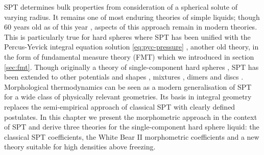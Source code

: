 \documentclass[11pt,twoside]{report}
\begin{document}
SPT determines bulk properties from consideration of a spherical solute of varying radius.
It remains one of most enduring theories of simple liquids; though 60 years old as of this year \cite{ReissJCP1959}, aspects of this approach remain in modern theories.
This is particularly true for hard spheres where SPT has been unified with the Percus-Yevick integral equation solution \eqref{eq:pyc-pressure} \cite{WertheimPRL1963}, another old theory, in the form of fundamental measure theory (FMT) \cite{RosenfeldPRL1989} which we introduced in section \ref{sec:fmt}.
Though originally a theory of single-component hard spheres \cite{ReissJCP1959}, SPT has been extended to other potentials \cite{ReissJCP1960,HelfandJCP1960,ReissJCP1961} and shapes \cite{GibbonsMP1969,GibbonsMP1970}, mixtures \cite{LebowitzJCP1965}, dimers \cite{StillingerJCP2006,ChatterjeeJCP2006} and discs \cite{HelfandJCP1961,MartinJCP2018,Hansen-GoosJCP2019}.
Morphological thermodynamics can be seen as a modern generalisation of SPT for a wide class of physically relevant geometries.
Its basis in integral geometry replaces the semi-empirical approach of classical SPT with clearly defined postulates.
In this chapter we present the morphometric approach in the context of SPT and derive three theories for the single-component hard sphere liquid: the classical SPT coefficients, the White Bear II morphometric coefficients%
and a new theory suitable for high densities above freezing.

\end{document}
